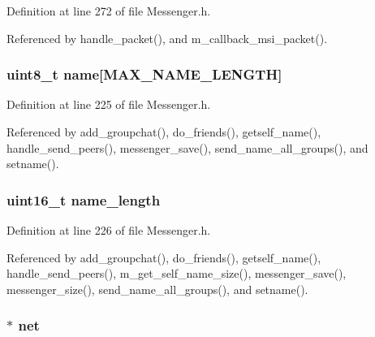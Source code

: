Definition at line 272 of file Messenger.\+h.



Referenced by handle\+\_\+packet(), and m\+\_\+callback\+\_\+msi\+\_\+packet().

\hypertarget{struct_messenger_a11b8cc6595eea79e65c978209278e683}{
\subsubsection[{name}]{\setlength{\rightskip}{0pt plus 5cm}uint8\+\_\+t name\mbox{[}{\bf M\+A\+X\+\_\+\+N\+A\+M\+E\+\_\+\+L\+E\+N\+G\+T\+H}\mbox{]}}}\label{struct_messenger_a11b8cc6595eea79e65c978209278e683}


Definition at line 225 of file Messenger.\+h.



Referenced by add\+\_\+groupchat(), do\+\_\+friends(), getself\+\_\+name(), handle\+\_\+send\+\_\+peers(), messenger\+\_\+save(), send\+\_\+name\+\_\+all\+\_\+groups(), and setname().

\hypertarget{struct_messenger_a3573d7a906b26e9999cd74f2c4066601}{
\subsubsection[{name\+\_\+length}]{\setlength{\rightskip}{0pt plus 5cm}uint16\+\_\+t name\+\_\+length}}\label{struct_messenger_a3573d7a906b26e9999cd74f2c4066601}


Definition at line 226 of file Messenger.\+h.



Referenced by add\+\_\+groupchat(), do\+\_\+friends(), getself\+\_\+name(), handle\+\_\+send\+\_\+peers(), m\+\_\+get\+\_\+self\+\_\+name\+\_\+size(), messenger\+\_\+save(), messenger\+\_\+size(), send\+\_\+name\+\_\+all\+\_\+groups(), and setname().

\hypertarget{struct_messenger_aa14ea2f67950f57fe4235d7375a2216c}{
\subsubsection[{net}]{$\ast$ net}}\label{struct_messenger_aa14ea2f67950f57fe4235d7375a2216c}


